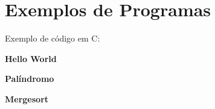 \chapter{Exemplos de Programas}
\setcounter{section}{0}

Exemplo de código em C: 
    
\textbf{Hello World}



\textbf{Palíndromo}



\textbf{Mergesort}


\newpage